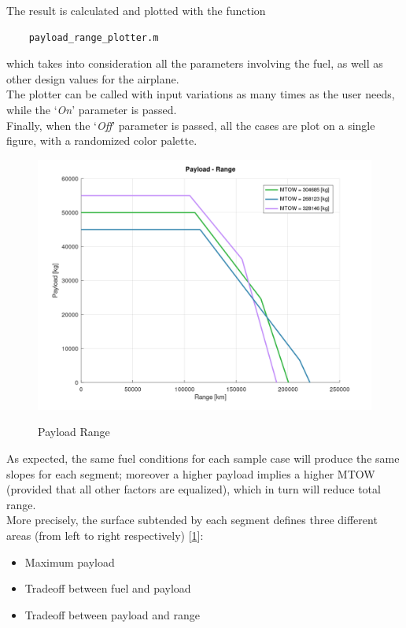\documentclass{article}
\begin{document}
The result is calculated and plotted with the function \autocite{Airbus_replacement_repo}
\begin{verbatim}
    payload_range_plotter.m
\end{verbatim}
which takes into consideration all the parameters involving the fuel, as well as other design values for the airplane.\\ 
The plotter can be called with input variations as many times as the user needs, while the `\textit{On}' parameter
is passed. \\ 
Finally, when the `\textit{Off}' parameter is passed, all the cases are plot on a single figure, with 
a randomized color palette.
\begin{figure}[h!]
    \centering
    \includegraphics[width=\textwidth]{Sources/Plots_and_Pictures/Payload_range.png}
    \label{Payload_Range}
    \caption{Payload Range}
\end{figure}
\clearpage

As expected, the same fuel conditions for each sample case will produce the same slopes for each segment; moreover a higher
payload implies a higher MTOW (provided that all other factors are equalized), which in turn will reduce total range.\\ 
More precisely, the surface subtended by each segment defines three different areas (from left to right respectively) [\ref{Payload_Range}]:
\begin{itemize}
    \item Maximum payload
    \item Tradeoff between fuel and payload
    \item Tradeoff between payload and range
\end{itemize}
\end{document}

